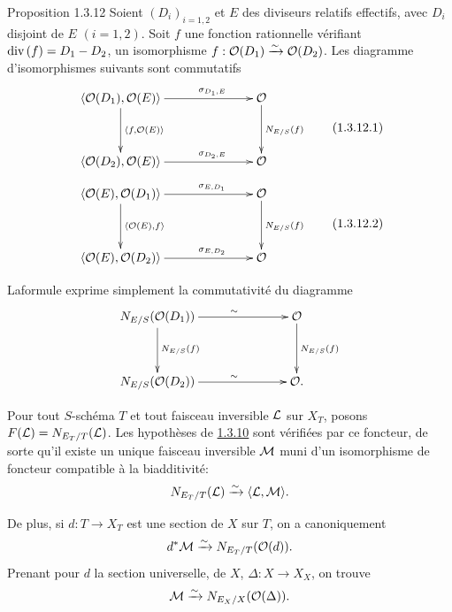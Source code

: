 \documentclass[10pt]{../fichiers-configuration-latex/smfart}
\begin{document}
\begin{enonce*}{Proposition 1.3.12}
Soient $(D_{i})_{i=1,2}$ et $E$ des diviseurs relatifs effectifs, avec
$D_{i}$ disjoint de $E$ $(i=1,2)$. Soit $f$ une fonction rationnelle
vérifiant $\text{\rm div\,}(f)=D_{1}-D_{2}$, \ie un isomorphisme
$f:{\mathcal O}(D_{1})\xrightarrow{\sim}{\mathcal O}(D_{2})$. Les diagramme
d'isomorphismes suivants sont commutatifs
\begin{equation*}
\vcenter{
\xymatrix@C=2.5cm@R=1.25cm{
\langle \Oo(D_1), \Oo(E)\rangle   \ar[d]^{\langle f,\Oo(E)\rangle } \ar[r]^(.65){\sigma_{D_{1},E}} & \Oo\ar[d]^{N_{E/S}(f)}\\
\langle \Oo(D_2),\Oo(E)\rangle    \ar[r]^(.65){\sigma_{D_{2},E}} & \Oo
}}\tag{1.3.12.1}
\end{equation*}
\begin{equation*}
\vcenter{
\xymatrix@C=2.5cm@R=1.25cm{
\langle \Oo(E), \Oo(D_1)\rangle   \ar[d]^{\langle \Oo(E),f\rangle } \ar[r]^(.65){\sigma_{E,D_{1}}} & \Oo\ar[d]^{N_{E/S}(f)}\\
\langle \Oo(E),\Oo(D_2)\rangle    \ar[r]^(.65){\sigma_{E,D_{2}}} & \Oo
}}\tag{1.3.12.2}
\end{equation*}
\end{enonce*}

La\pageoriginale formule  exprime simplement la
commutativité du diagramme
$$
\xymatrix@C=2.5cm@R=1.25cm{
N_{E/S}(\Oo(D_1))  \ar[r]^(.55){\sim} \ar[d]^{N_{E/S}(f)} & \Oo \ar[d]^{N_{E/S}(f)} \\         
N_{E/S}(\Oo(D_2))  \ar[r]^(.55){\sim} & \Oo.
}
$$

Pour tout $S$-schéma $T$ et tout faisceau inversible ${\mathcal L}$ sur
$X_{T}$, posons $F({\mathcal L})=N_{E_{T}/T}({\mathcal L})$. Les
hypothèses de \hyperref[XVIII.thm1.3.10]{1.3.10} sont vérifiées par ce foncteur, de
sorte qu'il existe un unique faisceau inversible ${\mathcal M}$ muni d'un
isomorphisme de foncteur compatible à la biadditivité:
$$
N_{E_{T}/T}({\mathcal L})\xrightarrow{\sim}\langle {\mathcal L},{\mathcal M}\rangle {}.
$$

De plus, si $d:T\rightarrow X_{T}$ est une section de $X$ sur $T$, on
a canoniquement
$$
d^{\ast}{\mathcal M}\xrightarrow{\sim} N_{E_{T}/T}({\mathcal O}(d)){}.
$$
Prenant pour $d$ la section universelle, de $X$, $\Delta:X\rightarrow
X_{X}$, on trouve 
$$
{\mathcal M}\xrightarrow{\sim} N_{E_{X}/X}({\mathcal O}(\Delta)){}.
$$
\end{document}
